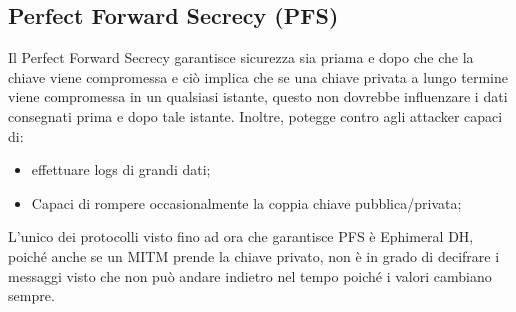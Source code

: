 \documentclass{book}
\theoremstyle{remark}
\begin{document}
\subsection{Perfect Forward Secrecy (PFS)}
Il Perfect Forward Secrecy garantisce sicurezza sia priama e dopo che che la chiave viene compromessa e ciò implica che se una chiave privata a lungo termine viene compromessa in un qualsiasi istante, questo non dovrebbe influenzare i dati consegnati prima e dopo tale istante\@.\newline
Inoltre, potegge contro agli attacker capaci di:\begin{itemize}
	\item effettuare logs di grandi dati;\@
	\item Capaci di rompere occasionalmente la coppia chiave pubblica/privata;\@
\end{itemize}
L'unico dei protocolli visto fino ad ora che garantisce PFS è Ephimeral DH, poiché anche se un MITM prende la chiave privato, non è in grado di decifrare i messaggi visto che non può andare indietro nel tempo poiché i valori cambiano sempre\@.
\end{document}
